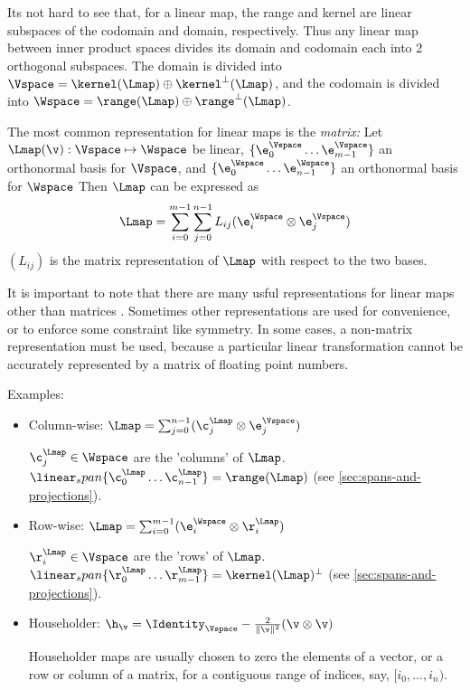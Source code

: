 Its not hard to see that, for a linear map,
the range and kernel are linear subspaces of the codomain and
domain, respectively.
Thus any linear map between inner product spaces
divides its domain and codomain each into 2 orthogonal subspaces.
The domain is divided into $\Vspace = \kernel(\Lmap) \oplus \kernel^{\perp}(\Lmap)$,
and the codomain is divided into $\Wspace = \range(\Lmap) \oplus \range^{\perp}(\Lmap)$.

The most common representation for linear maps is the {\it matrix:}
Let $\Lmap(\v):\Vspace \mapsto \Wspace$ be linear,
$\{ \e_0^{\Vspace} \ldots  \e_{m-1}^{\Vspace} \}$ an orthonormal basis for $\Vspace$,
and
$\{ \e_0^{\Wspace} \ldots \e_{n-1}^{\Wspace} \}$ an orthonormal  basis for $\Wspace$
Then $\Lmap$ can be expressed as
\begin{equation}
\Lmap
 =
\sum_{i=0}^{m-1} \sum_{j=0}^{n-1} L_{ij} ( \e_i^{\Wspace} \otimes \e_j^{\Vspace} )
\end{equation}
$(L_{ij})$ is the matrix representation of $\Lmap$ with respect to
the two bases\cite{Halmos:1958:Finite}.

It is important to note that there are many usful
representations for linear maps other than matrices \cite{McDonald:1989:OOPSLA}.
Sometimes other representations are used for convenience,
or to enforce some constraint like symmetry.
In some cases, a non-matrix representation must be used,
because a particular linear transformation
cannot be accurately represented by a matrix of floating point numbers.

Examples:

\begin{itemize}

\item Column-wise:
$\Lmap = \sum_{j=0}^{n-1} ( \c_j^{\Lmap} \otimes \e_j^{\Vspace} )$

$\c_j^{\Lmap} \in \Wspace$ are the 'columns' of $\Lmap$.
$\linear_span\{ \c_0^{\Lmap} \ldots \c_{n-1}^{\Lmap} \} = \range(\Lmap)$
(see \autoref{sec:spans-and-projections}).

\item Row-wise:
$\Lmap = \sum_{i=0}^{m-1} ( \e_i^{\Wspace} \otimes  \r_i^{\Lmap} )$

$\r_i^{\Lmap} \in \Vspace$ are the 'rows' of $\Lmap$.
$\linear_span\{ \r_0^{\Lmap} \ldots \r_{m-1}^{\Lmap} \} =  \kernel(\Lmap)^{\perp}$
(see \autoref{sec:spans-and-projections}).

\item Householder:
$\h_{\v} = \Identity_{\Vspace} - \frac{2}{\| \v \|^2} (\v \otimes \v)$

Householder maps are usually chosen to zero the elements of
a vector, or a row or column of a matrix, for a contiguous range of
indices, say, $[i_0,\ldots,i_n)$.

\end {itemize}

